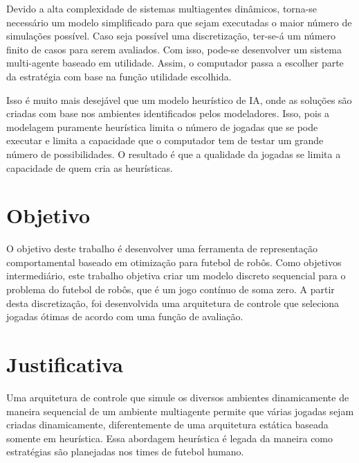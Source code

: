 Devido a alta complexidade de sistemas multiagentes dinâmicos, torna-se
necessário um modelo simplificado para que sejam executadas o maior número de
simulações possível.  Caso seja possível uma discretização, ter-se-á um número
finito de casos para serem avaliados. Com isso, pode-se desenvolver um sistema
multi-agente baseado em utilidade. Assim, o computador passa a escolher parte
da estratégia com base na função utilidade escolhida.

Isso é muito mais desejável que um modelo heurístico de IA, onde as soluções são
criadas com base nos ambientes identificados pelos modeladores. Isso, pois a
modelagem puramente heurística limita o número de jogadas que se pode executar e
limita a capacidade que o computador tem de testar um grande número de possibilidades.
O resultado é que a qualidade da jogadas se limita a capacidade de quem cria as
heurísticas.

\section{Objetivo}

O objetivo deste trabalho é desenvolver uma ferramenta de representação
comportamental baseado em otimização para futebol de robôs.
Como objetivos intermediário, este trabalho objetiva criar um modelo discreto
sequencial para o problema do futebol de robôs, que é um jogo contínuo de soma
zero.  A partir desta discretização, foi desenvolvida uma arquitetura de
controle que seleciona jogadas ótimas de acordo com uma função de avaliação.

\section{Justificativa}

Uma arquitetura de controle que simule os diversos ambientes dinamicamente de
maneira sequencial de um ambiente multiagente permite que várias jogadas sejam
criadas dinamicamente, diferentemente de uma arquitetura estática baseada somente
em heurística. Essa abordagem heurística é legada da maneira como estratégias
são planejadas nos times de futebol humano.

